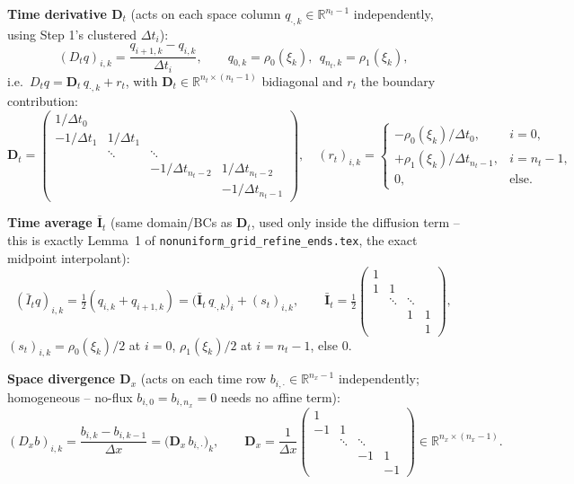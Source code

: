 \documentclass[11pt]{article}
\newcommand{\code}[1]{\texttt{#1}}
\begin{document}
\textbf{Time derivative $\mathbf{D}_t$} (acts on each space column $q_{\cdot,k}\in
\mathbb{R}^{n_t-1}$ independently, using Step 1's clustered $\Delta t_i$):
\begin{equation}
  (D_t q)_{i,k} = \frac{q_{i+1,k}-q_{i,k}}{\Delta t_i}, \qquad q_{0,k}=\rho_0(\xi_k),\ \
  q_{n_t,k}=\rho_1(\xi_k),
\end{equation}
i.e.\ $D_t q = \mathbf{D}_t\,q_{\cdot,k} + r_t$, with $\mathbf{D}_t\in
\mathbb{R}^{n_t\times(n_t-1)}$ bidiagonal and $r_t$ the boundary contribution:
\begin{equation}
  \mathbf{D}_t =
  \begin{pmatrix}
    1/\Delta t_0 & & & \\
    -1/\Delta t_1 & 1/\Delta t_1 & & \\
     & \ddots & \ddots & \\
     & & -1/\Delta t_{n_t-2} & 1/\Delta t_{n_t-2} \\
     & & & -1/\Delta t_{n_t-1}
  \end{pmatrix}\!, \quad
  (r_t)_{i,k} =
  \begin{cases}
    -\rho_0(\xi_k)/\Delta t_0, & i=0, \\
    +\rho_1(\xi_k)/\Delta t_{n_t-1}, & i=n_t-1, \\
    0, & \text{else}.
  \end{cases}
\end{equation}

\textbf{Time average $\bar{\mathbf{I}}_t$} (same domain/BCs as $\mathbf D_t$, used only
inside the diffusion term -- this is exactly Lemma~1 of
\code{nonuniform\_grid\_refine\_ends.tex}, the exact midpoint interpolant):
\begin{equation}
  (\bar I_t q)_{i,k} = \tfrac12(q_{i,k}+q_{i+1,k}) = \bigl(\bar{\mathbf I}_t\,q_{\cdot,k}\bigr)_i + (s_t)_{i,k},
  \qquad
  \bar{\mathbf I}_t = \tfrac12\begin{pmatrix}
    1 & & & \\
    1 & 1 & & \\
     & \ddots & \ddots & \\
     & & 1 & 1 \\
     & & & 1
  \end{pmatrix}\!,
\end{equation}
$(s_t)_{i,k}=\rho_0(\xi_k)/2$ at $i=0$, $\rho_1(\xi_k)/2$ at $i=n_t{-}1$, else $0$.

\textbf{Space divergence $\mathbf{D}_x$} (acts on each time row $b_{i,\cdot}\in
\mathbb{R}^{n_x-1}$ independently; homogeneous -- no-flux $b_{i,0}=b_{i,n_x}=0$ needs no
affine term):
\begin{equation}
  (D_x b)_{i,k} = \frac{b_{i,k}-b_{i,k-1}}{\Delta x} = \bigl(\mathbf{D}_x\,b_{i,\cdot}\bigr)_k,
  \qquad
  \mathbf{D}_x = \frac{1}{\Delta x}\begin{pmatrix}
    1 & & & \\
    -1 & 1 & & \\
     & \ddots & \ddots & \\
     & & -1 & 1 \\
     & & & -1
  \end{pmatrix} \in \mathbb{R}^{n_x\times(n_x-1)}.
\end{equation}
\end{document}
